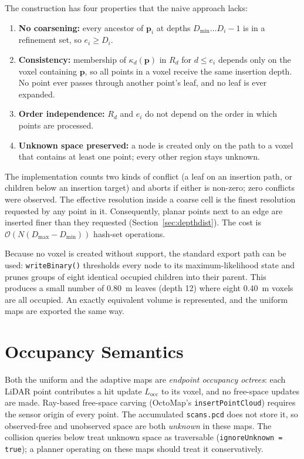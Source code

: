 \documentclass[11pt,a4paper]{report}
\begin{document}
The construction has four properties that the naive approach lacks:
\begin{enumerate}
    \item \textbf{No coarsening:} every ancestor of $\mathbf{p}_i$ at depths $D_{\min} \dots D_i - 1$ is in a refinement set, so $e_i \ge D_i$.
    \item \textbf{Consistency:} membership of $\kappa_d(\mathbf{p})$ in $R_d$ for $d \le e_i$ depends only on the voxel containing $\mathbf{p}$, so all points in a voxel receive the same insertion depth. No point ever passes through another point's leaf, and no leaf is ever expanded.
    \item \textbf{Order independence:} $R_d$ and $e_i$ do not depend on the order in which points are processed.
    \item \textbf{Unknown space preserved:} a node is created only on the path to a voxel that contains at least one point; every other region stays unknown.
\end{enumerate}
The implementation counts two kinds of conflict (a leaf on an insertion path, or children below an insertion target) and aborts if either is non-zero; zero conflicts were observed. The effective resolution inside a coarse cell is the finest resolution requested by any point in it. Consequently, planar points next to an edge are inserted finer than they requested (Section~\ref{sec:depthdist}). The cost is $\mathcal{O}(N (D_{\max} - D_{\min}))$ hash-set operations.

Because no voxel is created without support, the standard export path can be used: \texttt{writeBinary()} thresholds every node to its maximum-likelihood state and prunes groups of eight identical occupied children into their parent. This produces a small number of 0.80~m leaves (depth 12) where eight 0.40~m voxels are all occupied. An exactly equivalent volume is represented, and the uniform maps are exported the same way.

\section{Occupancy Semantics}
\label{sec:semantics}
Both the uniform and the adaptive maps are \emph{endpoint occupancy octrees}: each LiDAR point contributes a hit update $L_{\text{occ}}$ to its voxel, and no free-space updates are made. Ray-based free-space carving (OctoMap's \texttt{insertPointCloud}) requires the sensor origin of every point. The accumulated \texttt{scans.pcd} does not store it, so observed-free and unobserved space are both \emph{unknown} in these maps. The collision queries below treat unknown space as traversable (\texttt{ignoreUnknown = true}); a planner operating on these maps should treat it conservatively.
\end{document}
